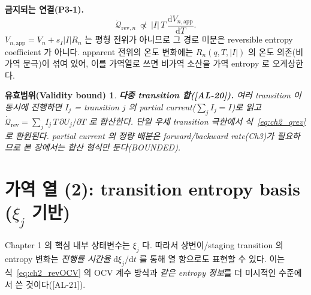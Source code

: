 \documentclass[11pt,a4paper]{article}
\newtheorem*{boundbox}{유효범위(Validity bound)}
\newcommand{\dd}{\mathrm{d}}
\newcommand{\app}{\mathrm{app}}
\newcommand{\rev}{\mathrm{rev}}
\newcommand{\AL}[1]{\textsf{[AL-#1]}}
\begin{document}
\textbf{금지되는 연결(P3-1).}
\begin{equation}
\dot{\mathcal Q}_{\rev,n}\ \not\propto\ |I|\,T\,\frac{\dd V_{n,\app}}{\dd T}.
\label{eq:ch2_forbidden}
\end{equation}
$V_{n,\app}=V_n+s_I|I|R_n$ 는 평형 전위가 아니므로 그 경로 미분은 reversible entropy coefficient 가 아니다.
apparent 전위의 온도 변화에는 $R_n(q,T,|I|)$ 의 온도 의존(비가역 분극)이 섞여 있어, 이를 가역열로 쓰면 비가역
소산을 가역 entropy 로 오계상한다.
\begin{boundbox}
\textbf{다중 transition 합(\AL{20}).} 여러 transition 이 동시에 진행하면 $I_j$ = transition $j$ 의 partial
current($\sum_j I_j=I$)로 읽고 $\dot{\mathcal Q}_{\rev}=\sum_j I_j\,T\,\partial U_j/\partial T$ 로 합산한다.
단일 우세 transition 극한에서 식~\eqref{eq:ch2_qrev} 로 환원된다. partial current 의 정량 배분은 forward/backward
rate(Ch3)가 필요하므로 본 장에서는 합산 형식만 둔다(BOUNDED).
\end{boundbox}

\section{가역 열 (2): transition entropy basis ($\xi_j$ 기반)}\label{sec:ch2_revxi}
Chapter 1 의 핵심 내부 상태변수는 $\xi_j$ 다. 따라서 상변이/staging transition 의 entropy 변화는 \emph{진행률
시간율} $\dd\xi_j/\dd t$ 를 통해 열 항으로도 표현할 수 있다. 이는 식~\eqref{eq:ch2_revOCV} 의 OCV 계수 방식과
\emph{같은 entropy 정보}를 더 미시적인 수준에서 쓴 것이다(\AL{21}).
\end{document}
